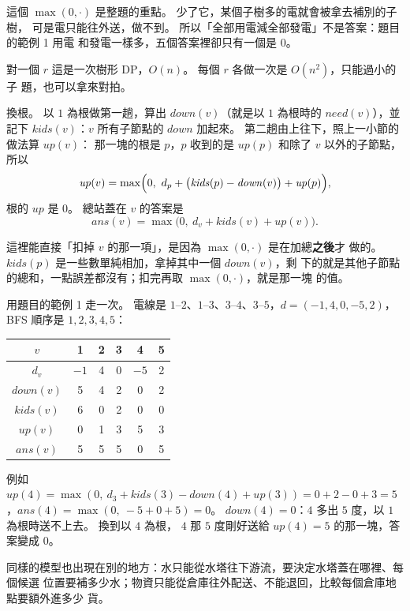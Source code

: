這個 $\max(0, \cdot)$ 是整題的重點。 少了它，某個子樹多的電就會被拿去補別的子樹，
可是電只能往外送，做不到。 所以「全部用電減全部發電」不是答案：題目的範例 1 用電
和發電一樣多，五個答案裡卻只有一個是 $0$。

對一個 $r$ 這是一次樹形 DP，$O(n)$。 每個 $r$ 各做一次是 $O(n^2)$，只能過小的子
題，也可以拿來對拍。

換根。 以 $1$ 為根做第一趟，算出 $\mathit{down}(v)$（就是以 $1$ 為根時的
$\mathit{need}(v)$），並記下 $\mathit{kids}(v)$：$v$ 所有子節點的
$\mathit{down}$ 加起來。 第二趟由上往下，照上一小節的做法算 $\mathit{up}(v)$：
那一塊的根是 $p$，$p$ 收到的是 $\mathit{up}(p)$ 和除了 $v$ 以外的子節點，所以
\[
\mathit{up}(v) = \max\Bigl(0,\ d_p + \bigl(\mathit{kids}(p) - \mathit{down}(v)\bigr) + \mathit{up}(p)\Bigr),
\]
根的 $\mathit{up}$ 是 $0$。 總站蓋在 $v$ 的答案是
\[
\mathit{ans}(v) = \max\bigl(0,\ d_v + \mathit{kids}(v) + \mathit{up}(v)\bigr).
\]

這裡能直接「扣掉 $v$ 的那一項」，是因為 $\max(0, \cdot)$ 是在加總\textbf{之後}才
做的。 $\mathit{kids}(p)$ 是一些數單純相加，拿掉其中一個 $\mathit{down}(v)$，剩
下的就是其他子節點的總和，一點誤差都沒有；扣完再取 $\max(0, \cdot)$，就是那一塊
的值。

用題目的範例 1 走一次。 電線是 $1$--$2$、$1$--$3$、$3$--$4$、$3$--$5$，$d =
(-1, 4, 0, -5, 2)$，BFS 順序是 $1, 2, 3, 4, 5$：

\begin{center}
\begin{tabular}{c|ccccc}
\toprule
$v$ & 1 & 2 & 3 & 4 & 5 \\
\midrule
$d_v$ & $-1$ & 4 & 0 & $-5$ & 2 \\
$\mathit{down}(v)$ & 5 & 4 & 2 & 0 & 2 \\
$\mathit{kids}(v)$ & 6 & 0 & 2 & 0 & 0 \\
$\mathit{up}(v)$ & 0 & 1 & 3 & 5 & 3 \\
$\mathit{ans}(v)$ & 5 & 5 & 5 & 0 & 5 \\
\bottomrule
\end{tabular}
\end{center}

例如 $\mathit{up}(4) = \max(0,\ d_3 + \mathit{kids}(3) - \mathit{down}(4) +
\mathit{up}(3)) = 0 + 2 - 0 + 3 = 5$，$\mathit{ans}(4) = \max(0,\ -5 + 0 + 5) = 0$。
$\mathit{down}(4) = 0$：$4$ 多出 $5$ 度，以 $1$ 為根時送不上去。 換到以 $4$ 為根，
$4$ 那 $5$ 度剛好送給 $\mathit{up}(4) = 5$ 的那一塊，答案變成 $0$。

同樣的模型也出現在別的地方：水只能從水塔往下游流，要決定水塔蓋在哪裡、每個候選
位置要補多少水；物資只能從倉庫往外配送、不能退回，比較每個倉庫地點要額外進多少
貨。

